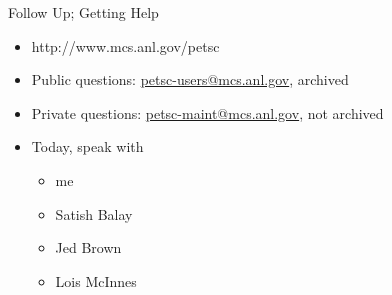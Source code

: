 \begin{frame}{Follow Up; Getting Help}
  \begin{itemize}
    \item http://www.mcs.anl.gov/petsc
    \item Public questions: \url{petsc-users@mcs.anl.gov}, archived
    \item Private questions: \url{petsc-maint@mcs.anl.gov}, not archived
    \item Today, speak with
    \begin{itemize}
      \item me
      \item Satish Balay
      \item Jed Brown
      \item Lois McInnes
    \end{itemize}
  \end{itemize}
\end{frame}
